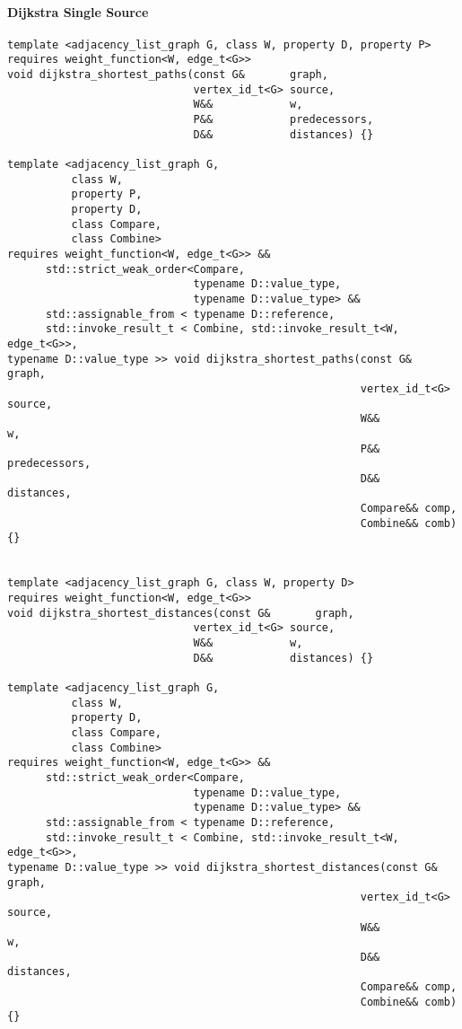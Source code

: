 \paragraph{Dijkstra Single Source}

\begin{lstlisting}
template <adjacency_list_graph G, class W, property D, property P>
requires weight_function<W, edge_t<G>>
void dijkstra_shortest_paths(const G&       graph,
                             vertex_id_t<G> source,
                             W&&            w,
                             P&&            predecessors,
                             D&&            distances) {}

template <adjacency_list_graph G,
          class W,
          property P,
          property D,
          class Compare,
          class Combine>
requires weight_function<W, edge_t<G>> &&
      std::strict_weak_order<Compare,
                             typename D::value_type,
                             typename D::value_type> &&
      std::assignable_from < typename D::reference,
      std::invoke_result_t < Combine, std::invoke_result_t<W, edge_t<G>>,
typename D::value_type >> void dijkstra_shortest_paths(const G&       graph,
                                                       vertex_id_t<G> source,
                                                       W&&            w,
                                                       P&&       predecessors,
                                                       D&&       distances,
                                                       Compare&& comp,
                                                       Combine&& comb) {}


template <adjacency_list_graph G, class W, property D>
requires weight_function<W, edge_t<G>>
void dijkstra_shortest_distances(const G&       graph,
                             vertex_id_t<G> source,
                             W&&            w,
                             D&&            distances) {}

template <adjacency_list_graph G,
          class W,
          property D,
          class Compare,
          class Combine>
requires weight_function<W, edge_t<G>> &&
      std::strict_weak_order<Compare,
                             typename D::value_type,
                             typename D::value_type> &&
      std::assignable_from < typename D::reference,
      std::invoke_result_t < Combine, std::invoke_result_t<W, edge_t<G>>,
typename D::value_type >> void dijkstra_shortest_distances(const G&       graph,
                                                       vertex_id_t<G> source,
                                                       W&&            w,
                                                       D&&       distances,
                                                       Compare&& comp,
                                                       Combine&& comb) {}


\end{lstlisting}


